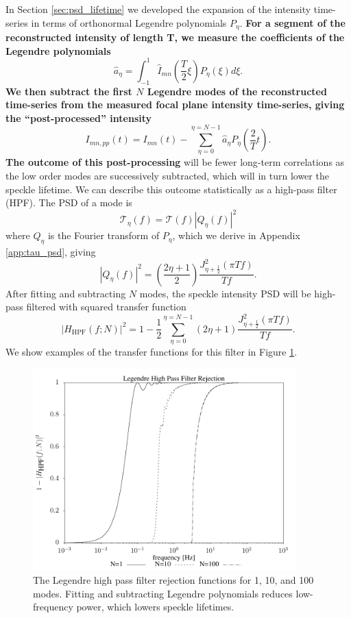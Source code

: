 \documentclass[10pt,preprint]{aastex631}
\begin{document}
In Section \ref{sec:psd_lifetime} we developed the expansion of the intensity time-series in terms of orthonormal Legendre polynomials $P_\eta$.  \textbf{For a segment of the reconstructed intensity of length T, we measure the coefficients of the Legendre polynomials}
\begin{equation}
\hat{a}_\eta = \int_{-1}^1 \hat{I}_{mn}\left(\frac{T}{2}\xi\right) P_\eta(\xi) d\xi. 
\end{equation}
\textbf{We then subtract the first $N$ Legendre modes of the reconstructed time-series from the measured focal plane intensity time-series, giving the ``post-processed'' intensity} 
\begin{equation}
I_{mn,pp}(t) = I_{mn}(t) - \sum_{\eta=0}^{\eta=N-1} \hat{a}_\eta P_\eta\left(\frac{2}{T}t\right). 
\end{equation}
\textbf{The outcome of this post-processing} will be fewer long-term correlations as the low order modes are successively subtracted, which will in turn lower the speckle lifetime.  We can describe this outcome statistically as a high-pass filter (HPF).  The PSD of a mode is
\begin{equation}
\mathcal{T}_\eta(f) = \mathcal{T}(f) \left|Q_\eta(f)\right|^2
\end{equation}
where ${Q}_\eta$ is the Fourier transform of $P_\eta$, which we derive in Appendix \ref{app:tau_psd}, giving
\begin{equation}
 \left|Q_\eta(f)\right|^2 = \left(\frac{2\eta+1}{2}\right)\frac{J_{\eta+\frac{1}{2}}^2(\pi T f)}{T f}.
\end{equation}
After fitting and subtracting $N$ modes, the speckle intensity PSD will be high-pass filtered with squared transfer function
\begin{equation}
\left| H_\mathrm{HPF}(f;N) \right| ^2 = 1 - \frac{1}{2}\sum_{\eta=0}^{\eta=N-1} (2\eta+1) \frac{J_{\eta+\frac{1}{2}}^2(\pi T f)}{T f}.
\end{equation}
We show examples of the transfer functions for this filter in Figure \ref{fig:leghpf}.  

\begin{figure}
\centering
\includegraphics[width=4in]{hpf.pdf}
\caption{The Legendre high pass filter rejection functions for 1, 10, and 100 modes. Fitting and subtracting Legendre polynomials reduces low-frequency power, which lowers speckle lifetimes.\label{fig:leghpf}}
\end{figure}
\end{document}
